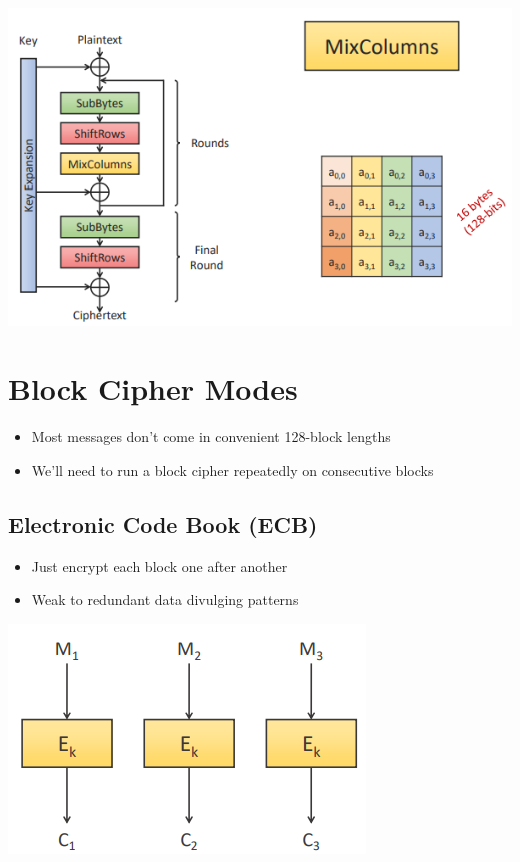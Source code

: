 \documentclass{article}
\begin{document}
\begin{center}
  \includegraphics[scale=0.5]{aes.png}
\end{center}

\section{Block Cipher Modes}
\begin{itemize}
  \item Most messages don’t come in convenient 128-block lengths 
  \item We’ll need to run a block cipher repeatedly on consecutive blocks
\end{itemize}

\subsection{Electronic Code Book (ECB)}
\begin{itemize}
  \item Just encrypt each block one after another 
  \item Weak to redundant data divulging patterns
\end{itemize}
\begin{center}
  \includegraphics[scale=0.5]{ecb.png}
\end{center}
\end{document}
